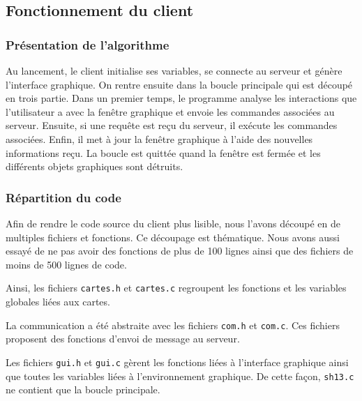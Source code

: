 \subsection{Fonctionnement du client}

\subsubsection{Présentation de l'algorithme}

Au lancement, le client initialise ses variables, se connecte au serveur et
génère l'interface graphique. On rentre ensuite dans la boucle principale qui
est découpé en trois partie. Dans un premier temps, le programme analyse les
interactions que l'utilisateur a avec la fenêtre graphique et envoie les
commandes associées au serveur. Ensuite, si une requête est reçu du serveur, il
exécute les commandes associées. Enfin, il met à jour la fenêtre graphique à
l'aide des nouvelles informations reçu. La boucle est quittée quand la fenêtre
est fermée et les différents objets graphiques sont détruits.

\subsubsection{Répartition du code}

Afin de rendre le code source du client plus lisible, nous l'avons découpé en
de multiples fichiers et fonctions. Ce découpage est thématique. Nous avons
aussi essayé de ne pas avoir des fonctions de plus de 100 lignes ainsi que des
fichiers de moins de 500 lignes de code.

Ainsi, les fichiers \verb=cartes.h= et \verb=cartes.c= regroupent les fonctions
et les variables globales liées aux cartes.

La communication a été abstraite avec les fichiers \verb=com.h= et \verb=com.c=.
Ces fichiers proposent des fonctions d'envoi de message au serveur.

Les fichiers \verb=gui.h= et \verb=gui.c= gèrent les fonctions liées à
l'interface graphique ainsi que toutes les variables liées à l'environnement
graphique. De cette façon, \verb=sh13.c= ne contient que la boucle principale.
